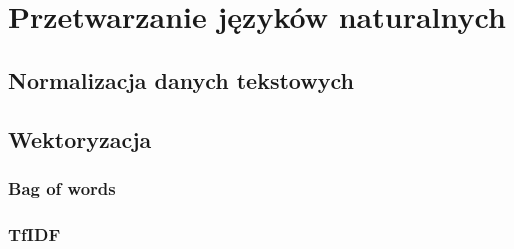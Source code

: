 
\chapter{Przetwarzanie języków naturalnych}
\section{Normalizacja danych tekstowych}
\section{Wektoryzacja}
\subsection{Bag of words}
\subsection{TfIDF}
